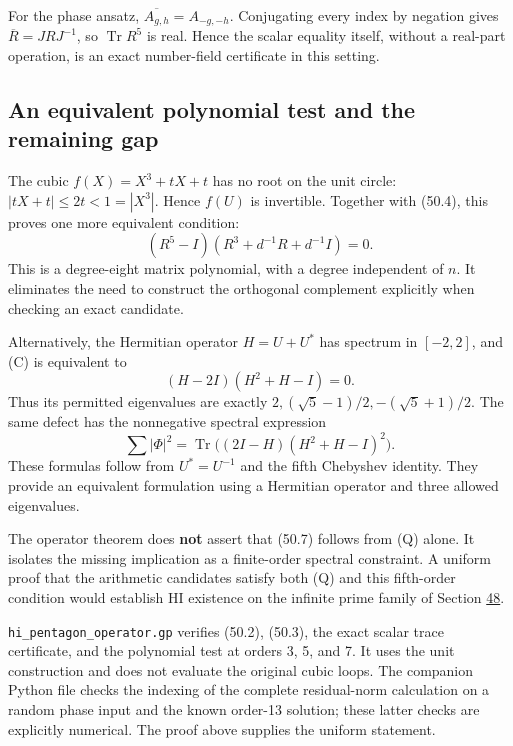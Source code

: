 \documentclass[11pt,reqno]{amsart}
\theoremstyle{plain}
\begin{document}
For the phase ansatz, \(\overline{A_{g,h}}=A_{-g,-h}\).
Conjugating every index by negation gives
\(\overline R=JRJ^{-1}\), so \(\operatorname{Tr}R^5\) is real.
Hence the scalar equality itself, without a real-part operation,
is an exact number-field certificate in this setting.

\subsection{An equivalent polynomial test and the remaining gap}\label{sec:50.3}

The cubic \(f(X)=X^3+tX+t\) has no root on the unit circle:
\(|tX+t|\le2t<1=|X^3|\). Hence \(f(U)\) is invertible.
Together with (50.4), this proves one more equivalent condition:
\begin{equation*}
 \boxed{
 (R^5-I)(R^3+d^{-1}R+d^{-1}I)=0.
 } \tag{50.9}
\end{equation*}
This is a degree-eight matrix polynomial, with a degree independent
of \(n\). It eliminates the need to construct the orthogonal
complement explicitly when checking an exact candidate.

Alternatively, the Hermitian operator \(H=U+U^*\) has spectrum in
\([-2,2]\), and (C) is equivalent to
\[
 (H-2I)(H^2+H-I)=0.
\]
Thus its permitted eigenvalues are exactly
\(2,(\sqrt5-1)/2,-(\sqrt5+1)/2\). The same defect has the
nonnegative spectral expression
\[
 \sum|\Phi|^2
 =\operatorname{Tr}\bigl((2I-H)(H^2+H-I)^2\bigr).
\]
These formulas follow from \(U^* = U^{-1}\) and the fifth
Chebyshev identity. They provide an equivalent formulation using a
Hermitian operator and three allowed eigenvalues.

The operator theorem does \textbf{not} assert that (50.7) follows from
(Q) alone. It isolates the missing implication as a finite-order
spectral constraint. A uniform proof that the arithmetic candidates
satisfy both (Q) and this fifth-order condition would establish HI
existence on the infinite prime family of Section \hyperref[sec:48]{48}.

\texttt{hi\_\allowbreak pentagon\_\allowbreak operator.gp} verifies (50.2), (50.3), the exact scalar
trace certificate, and the polynomial test at orders 3, 5, and 7.
It uses the unit construction and does not evaluate the original
cubic loops. The companion Python file checks the indexing of the
complete residual-norm calculation on a random phase input and the
known order-13 solution; these latter checks are explicitly numerical.
The proof above supplies the uniform statement.
\end{document}
